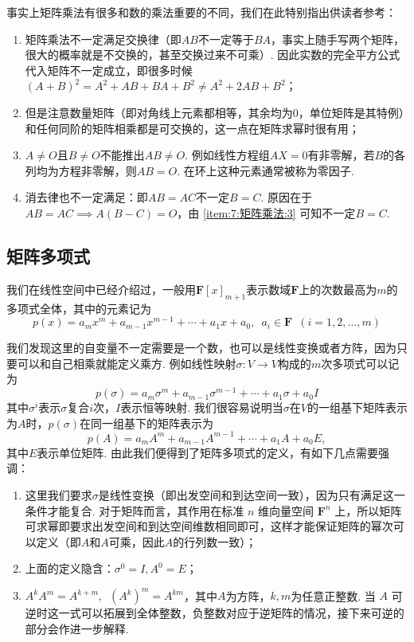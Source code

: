 事实上矩阵乘法有很多和数的乘法重要的不同，我们在此特别指出供读者参考：
\begin{enumerate}[label=(\arabic*)]
    \item 矩阵乘法不一定满足交换律（即$AB$不一定等于$BA$，事实上随手写两个矩阵，很大的概率就是不交换的，甚至交换过来不可乘）. 因此实数的完全平方公式代入矩阵不一定成立，即很多时候$(A+B)^2=A^2+AB+BA+B^2\neq A^2+2AB+B^2$；

    \item 但是注意数量矩阵（即对角线上元素都相等，其余均为0，单位矩阵是其特例）和任何同阶的矩阵相乘都是可交换的，这一点在矩阵求幂时很有用；

    \item \label{item:7:矩阵乘法:3}
          $A\neq O$且$B\neq O$不能推出$AB\neq O$. 例如线性方程组$AX = 0$有非零解，若$B$的各列均为方程非零解，则$AB = O$. 在环上这种元素通常被称为零因子.

    \item 消去律也不一定满足：即$AB = AC$不一定$B = C$. 原因在于$AB=AC \implies A(B-C)=O$，由 \ref*{item:7:矩阵乘法:3} 可知不一定$B = C$.
\end{enumerate}

\subsection{矩阵多项式}

我们在线性空间中已经介绍过，一般用$\mathbf{F}[x]_{m+1}$表示数域$\mathbf{F}$上的次数最高为$m$的多项式全体，其中的元素记为
\[p(x)=a_mx^m+a_{m-1}x^{m-1}+\cdots+a_1x+a_0,\enspace a_i\in\mathbf{F}\enspace(i=1,2,\ldots,m)\]

我们发现这里的自变量不一定需要是一个数，也可以是线性变换或者方阵，因为只要可以和自己相乘就能定义乘方. 例如线性映射$\sigma:V\to V$构成的$m$次多项式可以记为
\[p(\sigma)=a_m\sigma^m+a_{m-1}\sigma^{m-1}+\cdots+a_1\sigma+a_0I\]
其中$\sigma^i$表示$\sigma$复合$i$次，$I$表示恒等映射. 我们很容易说明当$\sigma$在$V$的一组基下矩阵表示为$A$时，$p(\sigma)$在同一组基下的矩阵表示为
\[p(A)=a_mA^m+a_{m-1}A^{m-1}+\cdots+a_1A+a_0E,\]
其中$E$表示单位矩阵. 由此我们便得到了矩阵多项式的定义，有如下几点需要强调：
\begin{enumerate}
    \item 这里我们要求$\sigma$是线性变换（即出发空间和到达空间一致），因为只有满足这一条件才能复合. 对于矩阵而言，其作用在标准 $n$ 维向量空间 $\mathbf{F}^n$ 上，所以矩阵可求幂即要求出发空间和到达空间维数相同即可，这样才能保证矩阵的幂次可以定义（即$A$和$A$可乘，因此$A$的行列数一致）；

    \item 上面的定义隐含：$\sigma^0 = I, A^0=E$；

    \item $A^kA^m=A^{k+m},\enspace (A^k)^m=A^{km}$，其中$A$为方阵，$k,m$为任意正整数. 当 $A$ 可逆时这一式可以拓展到全体整数，负整数对应于逆矩阵的情况，接下来可逆的部分会作进一步解释.
\end{enumerate}

